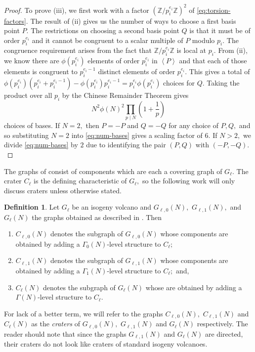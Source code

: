 \documentclass[11pt,a4paper]{amsart}
\theoremstyle{plain}
\theoremstyle{definition}
\newtheorem{defn}[thm]{Definition}
\theoremstyle{remark}
\begin{document}
\begin{proof}
  To prove (iii), we first work with a factor $(\mathbb{Z}/p_i^{e_i}\mathbb{Z})^2$ of \eqref{eq:torsion-factors}. The result of (ii) gives us the number of ways to choose a first basis point $P$. The restrictions on choosing a second basis point $Q$ is that it must be of order $p_i^{e_i}$ and it cannot be congruent to a scalar multiple of $P$ modulo $p_i.$ The congruence requirement arises from the fact that $\mathbb{Z}/p_i^{e_i} \mathbb{Z}$ is local at $p_i.$ From (ii), we know there are $\phi(p_i^{e_i})$ elements of order $p_i^{e_i}$ in $\left\langle P \right\rangle$ and that each of those elements is congruent to $p_i^{e_i-1}$ distinct elements of order $p_i^{e_i}.$ This gives a total of  $\phi(p_i^{e_i})(p_i^{e_i} + p_i^{e_i-1}) - \phi(p_i^{e_i})p_i^{e_i-1} = p_i^{e_i}\phi(p_i^{e_i})$ choices for $Q.$ Taking the product over all $p_i$ by the Chinese Remainder Theorem gives
  \begin{equation}\label{eq:num-bases}
    N^2\phi(N)^2\prod_{p \mid N}\left( 1 + \frac{1}{p} \right)
  \end{equation}
  choices of bases. If $N = 2,$ then $P = -P$ and $Q = -Q$ for any choice of $P, Q,$ and so substituting $N = 2$ into \eqref{eq:num-bases} gives a scaling factor of $6.$ If $N > 2,$ we divide \eqref{eq:num-bases} by $2$ due to identifying the pair $(P, Q)$ with $(-P, -Q).$
\end{proof}

The graphs of  consist of components which are each a covering graph of $G_{\ell}.$ The crater $C_{\ell}$ is the defining characteristic of $G_{\ell},$ so the following work will only discuss craters unless otherwise stated.

\begin{defn}
  Let $G_{\ell}$ be an isogeny volcano and $G_{\ell,0}(N),$ $G_{\ell,1}(N),$ and $G_{\ell}(N)$ the graphs obtained as described in . Then
  \begin{enumerate}[label=(\roman*)]
  \item $C_{\ell,0}(N)$ denotes the subgraph of $G_{\ell,0}(N)$ whose components are obtained by adding a $\Gamma_0(N)$-level structure to $C_{\ell};$
  \item $C_{\ell,1}(N)$ denotes the subgraph of $G_{\ell,1}(N)$ whose components are obtained by adding a $\Gamma_1(N)$-level structure to $C_{\ell};$ and,
  \item $C_{\ell}(N)$ denotes the subgraph of $G_{\ell}(N)$ whose are obtained by adding a $\Gamma(N)$-level structure to $C_{\ell}.$
  \end{enumerate}
\end{defn}
For lack of a better term, we will refer to the graphs $C_{\ell,0}(N),$ $C_{\ell,1}(N)$ and $C_{\ell}(N)$ as the \emph{craters} of $G_{\ell,0}(N),$ $G_{\ell,1}(N)$ and $G_{\ell}(N)$ respectively. The reader should note that since the graphs $G_{\ell,1}(N)$ and $G_{\ell}(N)$ are directed, their craters do not look like craters of standard isogeny volcanoes.
\end{document}
